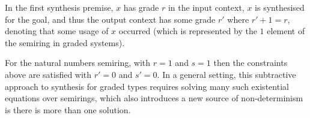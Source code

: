 %
In the first synthesis premise, $x$ has grade $r$ in the input context,
$x$ is synthesised for the goal, and thus the output context has some grade $r'$
where $r' + 1 = r$, denoting that some usage of $x$ occurred (which is
represented by the $1$ element of the semiring in graded systems).

For the natural numbers semiring, with $r = 1$ and $s = 1$ then the
constraints above are satisfied with $r' = 0$ and $s' = 0$. In a general setting, this
subtractive approach to synthesis for graded types requires solving many such
existential equations over semirings, which also introduces a new
source of non-determinism is there is more than one solution.

